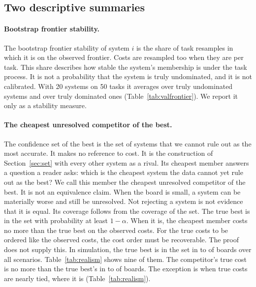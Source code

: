 \documentclass[11pt]{article}
\begin{document}
\subsection{Two descriptive summaries}
\label{sec:summaries}
\paragraph{Bootstrap frontier stability.}
The bootstrap frontier stability of system $i$ is the share of task resamples in which it is on the observed frontier. Costs are resampled too when they are per task. This share describes how stable the system's membership is under the task process. It is not a probability that the system is truly undominated, and it is not calibrated. With 20 systems on 50 tasks it averages \NumValFreqUndA{} over truly undominated systems and \NumValFreqDomA{} over truly dominated ones (Table~\ref{tab:valfrontier}). We report it only as a stability measure.

\paragraph{The cheapest unresolved competitor of the best.}
\label{sec:cheapest}
The confidence set of the best \citep{hsu1981mcb} is the set of systems that we cannot rule out as the most accurate. It makes no reference to cost. It is the construction of Section~\ref{sec:set} with every other system as a rival. Its cheapest member answers a question a reader asks: which is the cheapest system the data cannot yet rule out as the best? We call this member the cheapest unresolved competitor of the best. It is not an equivalence claim. When the board is small, a system can be materially worse and still be unresolved. Not rejecting a system is not evidence that it is equal. Its coverage follows from the coverage of the set. The true best is in the set with probability at least $1-\alpha$. When it is, the cheapest member costs no more than the true best on the observed costs. For the true costs to be ordered like the observed costs, the cost order must be recoverable. The proof does not supply this. In simulation, the true best is in the set in \NumValBestInMin{} to \NumValBestInMax{} of boards over all \NumValScenarios{} scenarios. Table~\ref{tab:realism} shows nine of them. The competitor's true cost is no more than the true best's in \NumValCpbOkOtherMin{} to \NumValCpbOkOtherMax{} of boards. The exception is when true costs are nearly tied, where it is \NumValScNearTiedCostsCpbOk{} (Table~\ref{tab:realism}).
\end{document}

